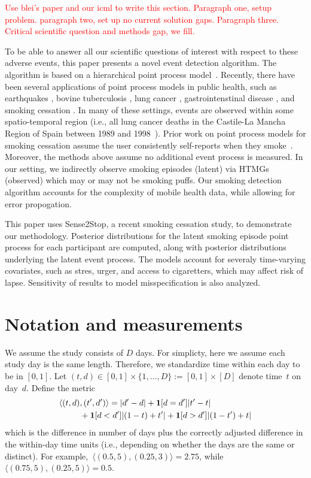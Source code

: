 \documentclass[11pt]{amsart}
\def\indicator{{\bf 1}}
\begin{document}
\textcolor{red}{Use blei's paper and our icml to write this
  section. Paragraph one, setup problem. paragraph two, set up no
  current solution gaps. Paragraph three. Critical scientific question
  and methods gap, we fill.}

To be able to answer all our scientific questions of interest with
respect to these adverse events, this paper presents a novel event
detection algorithm. The algorithm is based on a hierarchical point
process model~\cite{Blei, DempseyICML}.  Recently, there have been
several applications of point process models in public health, such as
earthquakes \cite{RevMCMCguys}, bovine tuberculosis
\cite{DiggleStatSci}, lung cancer \cite{DiggleStatSci},
gastrointenstinal disease \cite{DiggleStatSci}, and smoking cessation
\cite{MLHealth paper}.
In many of these settings, events are observed within some
spatio-temporal region (i.e., all lung cancer deaths in the Castile-La
Mancha Region of Spain between 1989 and 1998~\cite{DiggleStatSci}).
Prior work on point process models for smoking cessation assume the
user consistently self-reports when they smoke~\cite{MLHealth}.
Moreover, the methods above assume no additional event process is
measured.
In our setting, we indirectly observe smoking episodes (latent) via
HTMGs (observed) which may or may not be smoking puffs.
Our smoking detection algorithm accounts for the complexity of mobile
health data, while allowing for error propogation.

This paper uses Sense2Stop, a recent smoking cessation study, to
demonstrate our methodology.  Posterior distributions for the latent
smoking episode point process for each participant are computed, along
with posterior distributions underlying the latent event process.
The models account for severaly time-varying covariates, such as
stres, urger, and access to cigaretters, which may affect risk of
lapse. Sensitivity of results to model misspecification is also
analyzed.

\section{Notation and measurements}

We assume the study consists of $D$ days.  For simplicty, here we assume each study day is the same length. Therefore, we standardize time within each day to be in $[0,1]$. Let $(t,d) \in [0,1] \times \{ 1,\ldots, D \} := [0,1] \times
[D]$ denote time~$t$ on day~$d$. Define the metric
\begin{align*}
\langle (t,d) &, (t^\prime, d^\prime ) \rangle = |d^\prime - d| +
\indicator [ d = d^\prime ] | t^\prime  - t | \\
&+ \indicator[ d < d^\prime ] | (1-t) + t^\prime | + \indicator[ d >
  d^\prime ] | (1-t^\prime) + t |
\end{align*}
which is the difference in number of days plus the correctly
adjusted difference in the within-day time units (i.e., depending on whether
the days are the same or distinct).
For example,~$\langle (0.5, 5), (0.25, 3) \rangle = 2.75$, while
$\langle (0.75, 5), (0.25, 5) \rangle = 0.5$.
\end{document}
